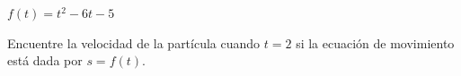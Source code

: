 \item $f(t) = t^2 - 6t - 5$
\par
Encuentre la velocidad de la partícula cuando $t = 2$ si la ecuación de movimiento está dada por $s = f(t)$.
